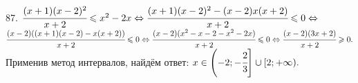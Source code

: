 87. $\cfrac{(x+1)(x-2)^2}{x+2}\leqslant x^2-2x\Leftrightarrow \cfrac{(x+1)(x-2)^2-(x-2)x(x+2)}{x+2}\leqslant0\Leftrightarrow$\\
$\cfrac{(x-2)((x+1)(x-2)-x(x+2))}{x+2}\leqslant0\Leftrightarrow\cfrac{(x-2)(x^2-x-2-x^2-2x)}{x+2}\leqslant0
\Leftrightarrow \cfrac{(x-2)(3x+2)}{x+2}\geqslant0.$ Применив метод интервалов, найдём ответ: $x\in\left(-2;-\cfrac{2}{3}\right]\cup[2;+\infty).$
\begin{figure}[ht!]
\end{figure}\\

